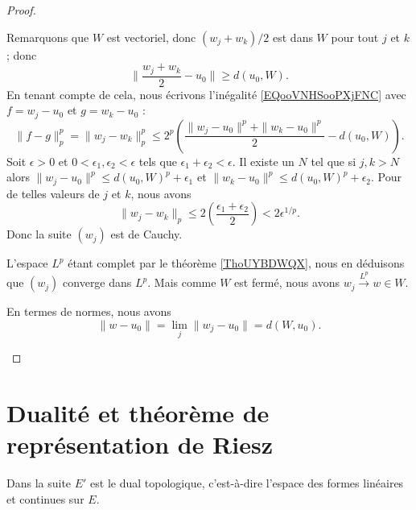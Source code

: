 \begin{proof}
\begin{subproof}
            Remarquons que \( W\) est vectoriel, donc \( (w_j+w_k)/2\) est dans \( W\) pour tout \( j\) et \( k\); donc
            \begin{equation}
                \| \frac{ w_j+w_k }{2}-u_0 \|\geq d(u_0,W).
            \end{equation}
            En tenant compte de cela, nous écrivons l'inégalité \eqref{EQooVNHSooPXjFNC} avec \( f=w_j-u_0\) et \( g=w_k-u_0\) :
            \begin{equation}
                \| f-g \|_p^p=\| w_j-w_k \|_p^p\leq 2^p\left( \frac{ \| w_j-u_0 \|^p+\| w_k-u_0 \|^p }{2}-d(u_0,W) \right).
            \end{equation}
            Soit \( \epsilon>0\) et \( 0<\epsilon_1,\epsilon_2<\epsilon\) tels que \( \epsilon_1+\epsilon_2<\epsilon\). Il existe un \( N\) tel que si \( j,k>N\) alors \( \| w_j-u_0 \|^p\leq d(u_0,W)^p+\epsilon_1\) et \( \| w_k-u_0 \|^p\leq d(u_0,W)^p+\epsilon_2\). Pour de telles valeurs de \( j\) et \( k\), nous avons
            \begin{equation}
                \| w_j-w_k \|_p\leq 2\left( \frac{ \epsilon_1+\epsilon_2 }{2} \right)<2\epsilon^{1/p}.
            \end{equation}
            Donc la suite \( (w_j)\) est de Cauchy.

            L'espace \( L^p\) étant complet par le théorème \ref{ThoUYBDWQX}, nous en déduisons que \( (w_j)\) converge dans \( L^p\). Mais comme \( W\) est fermé, nous avons \( w_j\stackrel{L^p}{\longrightarrow}w\in W\).

            En termes de normes, nous avons
            \begin{equation}
                \| w-u_0 \|=\lim_j\| w_j-u_0 \|=d(W,u_0).
            \end{equation}
    \end{subproof}
\end{proof}

\section{Dualité et théorème de représentation de Riesz}

Dans la suite \( E'\) est le dual topologique, c'est-à-dire l'espace des formes linéaires et continues sur \( E\).

